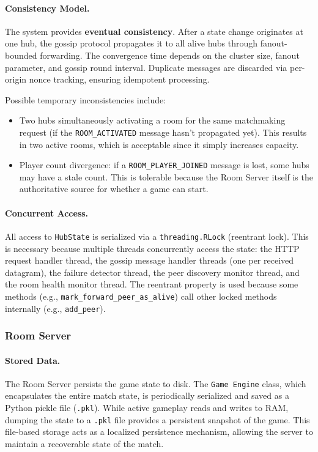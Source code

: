 \paragraph{Consistency Model.}
The system provides \textbf{eventual consistency}.
After a state change originates at one hub, the gossip protocol propagates it to all alive hubs through fanout-bounded forwarding.
The convergence time depends on the cluster size, fanout parameter, and gossip round interval.
Duplicate messages are discarded via per-origin nonce tracking, ensuring idempotent processing.

Possible temporary inconsistencies include:
\begin{itemize}
  \item Two hubs simultaneously activating a room for the same matchmaking request (if the \texttt{ROOM\_ACTIVATED} message hasn't propagated yet). This results in two active rooms, which is acceptable since it simply increases capacity.
  \item Player count divergence: if a \texttt{ROOM\_PLAYER\_JOINED} message is lost, some hubs may have a stale count. This is tolerable because the Room Server itself is the authoritative source for whether a game can start.
\end{itemize}

\paragraph{Concurrent Access.}
All access to \texttt{HubState} is serialized via a \texttt{threading.RLock} (reentrant lock).
This is necessary because multiple threads concurrently access the state: the HTTP request handler thread, the gossip message handler threads (one per received datagram), the failure detector thread, the peer discovery monitor thread, and the room health monitor thread.
The reentrant property is used because some methods (e.g., \texttt{mark\_forward\_peer\_as\_alive}) call other locked methods internally (e.g., \texttt{add\_peer}).

\subsubsection{Room Server}

\paragraph{Stored Data.}
The Room Server persists the game state to disk. 
The \texttt{Game Engine} class, which encapsulates the entire match state, is periodically serialized and saved as a Python pickle file (\texttt{.pkl}). 
While active gameplay reads and writes to RAM, dumping the state to a \texttt{.pkl} file provides a persistent snapshot of the game. 
This file-based storage acts as a localized persistence mechanism, allowing the server to maintain a recoverable state of the match.

